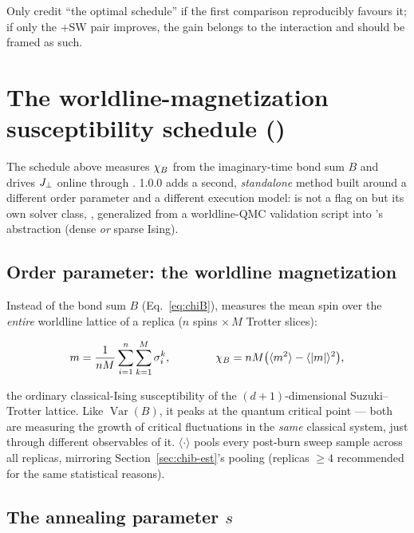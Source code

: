 Only credit ``the optimal schedule'' if the first comparison reproducibly
favours it; if only the +SW pair improves, the gain belongs to the
interaction and should be framed as such.

\section{The worldline-magnetization susceptibility schedule
(\texorpdfstring{}{sqa\_chi})}
\label{sec:sqa-chi}

The schedule above measures $\chi_B$ from the imaginary-time bond sum $B$
and drives $J_{\perp}$ online through . \qv{} 1.0.0 adds a
second, \emph{standalone} method built around a different order parameter
and a different execution model:  is not a
 flag on  but its own solver class,
, generalized from a worldline-QMC validation script
into \qv's  abstraction (dense \emph{or} sparse Ising).

\subsection{Order parameter: the worldline magnetization}
\label{sec:sqa-chi-order-param}

Instead of the bond sum $B$ (Eq.~\eqref{eq:chiB}),  measures
the mean spin over the \emph{entire} worldline lattice of a replica ($n$
spins $\times\,M$ Trotter slices):
\begin{keyeq}
\begin{equation}
m=\frac{1}{nM}\sum_{i=1}^{n}\sum_{k=1}^{M}\sigma_i^k,
\qquad\qquad
\chi_B = nM\bigl(\langle m^2\rangle-\langle|m|\rangle^2\bigr),
\label{eq:chib-magnetization}
\end{equation}
\end{keyeq}
the ordinary classical-Ising susceptibility of the $(d{+}1)$-dimensional
Suzuki--Trotter lattice. Like $\operatorname{Var}(B)$, it peaks at the
quantum critical point --- both are measuring the growth of critical
fluctuations in the \emph{same} classical system, just through different
observables of it. $\langle\cdot\rangle$ pools every post-burn sweep sample
across all replicas, mirroring Section~\ref{sec:chib-est}'s pooling
(replicas $\ge4$ recommended for the same statistical reasons).

\subsection{The annealing parameter \texorpdfstring{$s$}{s}}

